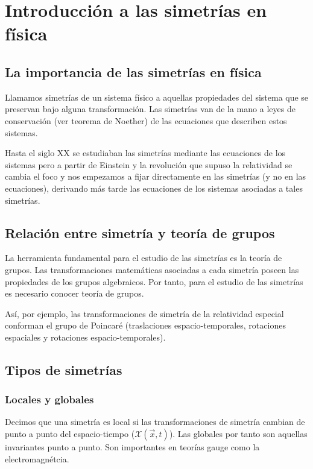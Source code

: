 
\section{Introducción a las simetrías en física}
\subsection{La importancia de las simetrías en física}

Llamamos simetrías de un sistema físico a aquellas propiedades del sistema que se preservan bajo alguna transformación. Las simetrías van de la mano a leyes de conservación (ver teorema de Noether) de las ecuaciones que describen estos sistemas.

Hasta el siglo XX se estudiaban las simetrías mediante las ecuaciones de los sistemas pero a partir de Einstein y la revolución que supuso la relatividad se cambia el foco y nos empezamos a fijar directamente en las simetrías (y no en las ecuaciones), derivando más tarde las ecuaciones de los sistemas asociadas a tales simetrías.

\subsection{Relación entre simetría y teoría de grupos}

La herramienta fundamental para el estudio de las simetrías es la teoría de grupos. Las transformaciones matemáticas asociadas a cada simetría poseen las propiedades de los grupos algebraicos. Por tanto, para el estudio de las simetrías es necesario conocer teoría de grupos.

\smallskip
Así, por ejemplo, las transformaciones de simetría de la relatividad especial conforman el grupo de Poincaré (traslaciones espacio-temporales, rotaciones espaciales y rotaciones espacio-temporales).

\subsection{Tipos de simetrías}

\subsubsection{Locales y globales}
Decimos que una simetría es local si las transformaciones de simetría cambian de punto a punto del espacio-tiempo ($\mathcal{X}(\Vec{x},t)$). Las globales por tanto son aquellas invariantes punto a punto. Son importantes en teorías gauge como la electromagnétcia.

